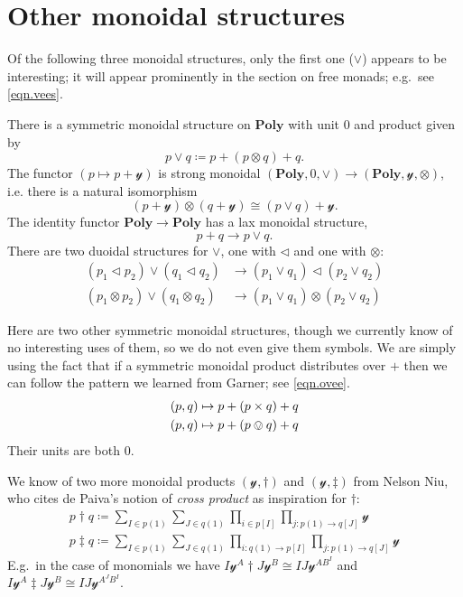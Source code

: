 \documentclass[11pt, one side, article]{memoir}
\theoremstyle{definition}
\theoremstyle{plain}
\newcommand{\Cat}[1]{\mathbf{#1}}%
\newcommand{\yon}{\mathcal{y}}
\newcommand{\poly}{\Cat{Poly}}
\newcommand{\0}{\textsf{0}}
\newcommand{\1}{\tn{\textsf{1}}}
\newcommand{\tri}{\mathbin{\triangleleft}}
\begin{document}
\chapter{Other monoidal structures}

Of the following three monoidal structures, only the first one ($\vee$) appears to be interesting; it will appear prominently in the section on free monads; e.g.\ see \eqref{eqn.vees}.

There is a symmetric monoidal structure on $\poly$ with unit $0$ and product given by
\begin{equation}
  p\vee q\coloneqq p+(p\otimes q)+q.
\end{equation}
The functor $(p\mapsto p+\yon)$ is strong monoidal $(\poly,0,\vee)\to(\poly,\yon,\otimes)$, i.e. there is a natural isomorphism
\begin{equation}
	(p+\yon)\otimes(q+\yon)\cong (p\vee q)+\yon.
\end{equation}
The identity functor $\poly\to\poly$ has a lax monoidal structure,
\begin{equation}
	p+q\to p\vee q.
\end{equation}
There are two duoidal structures for $\vee$, one with $\tri$ and one with $\otimes$:
\begin{align*}
	(p_1\tri p_2)\vee(q_1\tri q_2)&\to(p_1\vee q_1)\tri(p_2\vee q_2)\\
	(p_1\otimes p_2)\vee(q_1\otimes q_2)&\to(p_1\vee q_1)\otimes(p_2\vee q_2)
\end{align*}

Here are two other symmetric monoidal structures, though we currently know of no interesting uses of them, so we do not even give them symbols. We are simply using the fact that if a symmetric monoidal product distributes over $+$ then we can follow the pattern we learned from Garner; see \eqref{eqn.ovee}.
\begin{align}
	(p,q)&\mapsto p+(p\times q)+q\\
	(p,q)&\mapsto p+(p\ovee q)+q
\end{align}
Their units are both $0$. 

We know of two more monoidal products $(\yon,\dagger)$ and $(\yon, \ddagger)$ from Nelson Niu, who cites de Paiva's notion of \emph{cross product} as inspiration for $\dagger$:
\begin{align}
	p\dagger q\coloneqq\sum_{I\in p(1)}\sum_{J\in q(1)}\prod_{i\in p[I]}\prod_{j\colon p(1)\to q[J]}\yon\\
	p\ddagger q\coloneqq\sum_{I\in p(1)}\sum_{J\in q(1)}\prod_{i\colon q(1)\to p[I]}\prod_{j\colon p(1)\to q[J]}\yon
\end{align}
E.g.\ in the case of monomials we have $I\yon^A\dagger J\yon^B\cong IJ\yon^{AB^I}$ and $I\yon^A\ddagger J\yon^B\cong IJ\yon^{A^JB^I}$.
\end{document}

